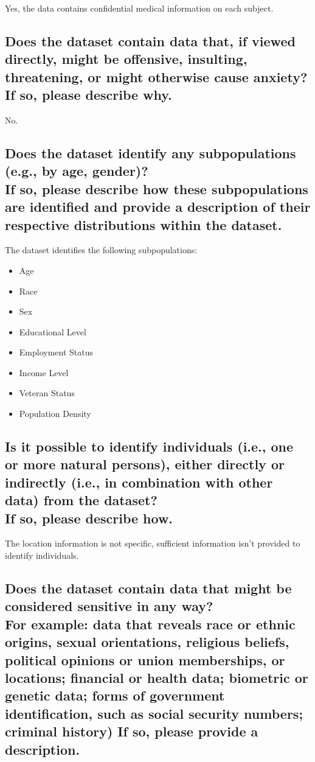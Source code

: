 \documentclass[letterpaper, 10 pt, conference]{ieeeconf}  %
\newcommand{\subtitle}[1]{{\\ \small \normalfont \color{purple} #1}}
\begin{document}
Yes, the data contains confidential medical information on each subject. 

\subsection{Does the dataset contain data that, if viewed directly, might be offensive, insulting, threatening, or might otherwise cause anxiety? \subtitle{If so, please describe why.}}

No.

\subsection{Does the dataset identify any subpopulations (e.g., by age, gender)? \subtitle{If so, please describe how these subpopulations are identified and provide a description of their respective distributions within the dataset.}}

The dataset identifies the following subpopulations:

\begin{itemize}
    \item Age
    \item Race
    \item Sex
    \item Educational Level
    \item Employment Status
    \item Income Level
    \item Veteran Status
    \item Population Density
\end{itemize}

\subsection{Is it possible to identify individuals (i.e., one or more natural persons), either directly or indirectly (i.e., in combination with other data) from the dataset? \subtitle{If so, please describe how.}}

The location information is not specific, sufficient information isn't provided to identify individuals. 

\subsection{Does the dataset contain data that might be considered sensitive in any way? \subtitle{For example: data that reveals race or ethnic origins, sexual orientations, religious beliefs, political opinions or union memberships, or locations; financial or health data; biometric or genetic data; forms of government identification, such as social security numbers; criminal history) If so, please provide a description.}}
\end{document}
